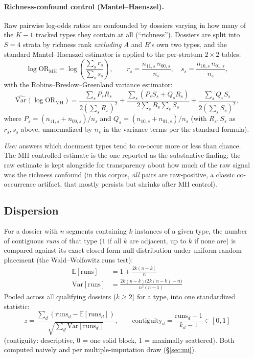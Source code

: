 \paragraph{Richness-confound control (Mantel--Haenszel).} Raw pairwise
log-odds ratios are confounded by dossiers varying in how many of the $K{-}1$
tracked types they contain at all (``richness''). Dossiers are split into
$S=4$ strata by richness rank \emph{excluding} $A$ and $B$'s own two types,
and the standard Mantel--Haenszel estimator is applied to the per-stratum
$2\times2$ tables:
\begin{equation}
  \log\text{OR}_{\text{MH}} = \log\!\left(\frac{\sum_s r_s}{\sum_s s_s}\right),
  \qquad
  r_s = \frac{n_{11,s}\, n_{00,s}}{n_s}, \quad
  s_s = \frac{n_{10,s}\, n_{01,s}}{n_s},
\end{equation}
with the Robins--Breslow--Greenland variance estimator:
\begin{equation}
  \widehat{\mathrm{Var}}(\log\text{OR}_{\text{MH}}) =
    \frac{\sum_s P_s R_s}{2\left(\sum_s R_s\right)^2} +
    \frac{\sum_s (P_s S_s + Q_s R_s)}{2 \sum_s R_s \sum_s S_s} +
    \frac{\sum_s Q_s S_s}{2\left(\sum_s S_s\right)^2},
\end{equation}
where $P_s = (n_{11,s}{+}n_{00,s})/n_s$ and $Q_s = (n_{10,s}{+}n_{01,s})/n_s$
(with $R_s, S_s$ as $r_s, s_s$ above, unnormalized by $n_s$ in the variance
terms per the standard formula).

\textit{Use:} answers which document types tend to co-occur more or less
than chance. The MH-controlled estimate is the one reported as the
substantive finding; the raw estimate is kept alongside for transparency
about how much of the raw signal was the richness confound (in this corpus,
\emph{all} pairs are raw-positive, a classic co-occurrence artifact, that
mostly persists but shrinks after MH control).

\subsection{Dispersion}
\label{sec:dispersion}

For a dossier with $n$ segments containing $k$ instances of a given type,
the number of contiguous \emph{runs} of that type ($1$ if all $k$ are
adjacent, up to $k$ if none are) is compared against its exact closed-form
null distribution under uniform-random placement (the Wald--Wolfowitz runs
test):
\begin{align}
  \mathbb{E}[\text{runs}] &= 1 + \frac{2k(n-k)}{n} \\
  \mathrm{Var}[\text{runs}] &= \frac{2k(n-k)\bigl(2k(n-k) - n\bigr)}{n^2(n-1)}
\end{align}
Pooled across all qualifying dossiers ($k\ge2$) for a type, into one
standardized statistic:
\begin{equation}
  z = \frac{\sum_d \left(\text{runs}_d - \mathbb{E}[\text{runs}_d]\right)}
           {\sqrt{\sum_d \mathrm{Var}[\text{runs}_d]}},
  \qquad
  \text{contiguity}_d = \frac{\text{runs}_d - 1}{k_d - 1} \in [0,1]
\end{equation}
(contiguity: descriptive, 0 = one solid block, 1 = maximally scattered).
Both computed naively and per multiple-imputation draw (\S\ref{sec:mi}).

